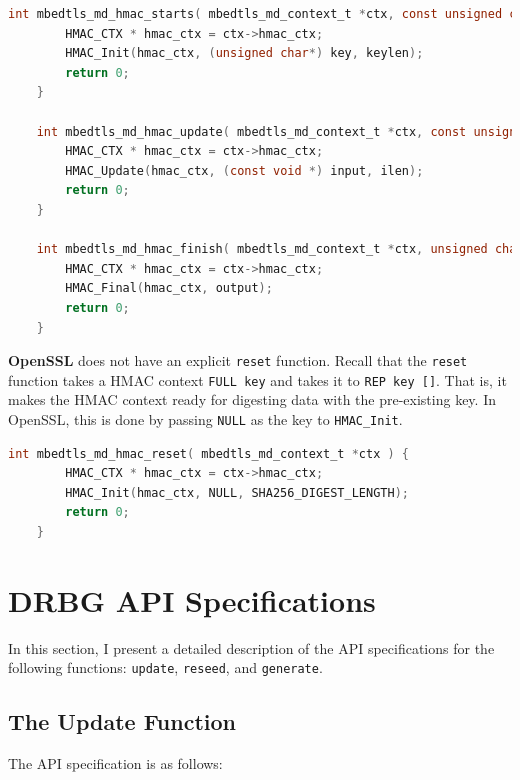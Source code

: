 \documentclass[pageno]{jpaper}
\newcommand{\stdtitle}[1]{\textbf{#1}}
\begin{document}
\begin{lstlisting}[language=C]
    int mbedtls_md_hmac_starts( mbedtls_md_context_t *ctx, const unsigned char *key, size_t keylen ) {
        HMAC_CTX * hmac_ctx = ctx->hmac_ctx;
        HMAC_Init(hmac_ctx, (unsigned char*) key, keylen);
        return 0;
    }

    int mbedtls_md_hmac_update( mbedtls_md_context_t *ctx, const unsigned char *input, size_t ilen ) {
        HMAC_CTX * hmac_ctx = ctx->hmac_ctx;
        HMAC_Update(hmac_ctx, (const void *) input, ilen);
        return 0;
    }

    int mbedtls_md_hmac_finish( mbedtls_md_context_t *ctx, unsigned char *output) {
        HMAC_CTX * hmac_ctx = ctx->hmac_ctx;
        HMAC_Final(hmac_ctx, output);
        return 0;
    }
\end{lstlisting}

\stdtitle{OpenSSL} does not have an explicit \lstinline{reset} function. Recall that the \lstinline{reset} function takes a HMAC context \lstinline{FULL key} and takes it to \lstinline{REP key []}. That is, it makes the HMAC context ready for digesting data with the pre-existing key. In OpenSSL, this is done by passing \lstinline{NULL} as the key to \lstinline{HMAC_Init}.

\begin{lstlisting}[language=C]
    int mbedtls_md_hmac_reset( mbedtls_md_context_t *ctx ) {
        HMAC_CTX * hmac_ctx = ctx->hmac_ctx;
        HMAC_Init(hmac_ctx, NULL, SHA256_DIGEST_LENGTH);
        return 0;
    }
\end{lstlisting}
\section{DRBG API Specifications} \label{appendix_api}
In this section, I present a detailed description of the API specifications for the following functions: \lstinline{update}, \lstinline{reseed}, and \lstinline{generate}.

\subsection{The Update Function}

The API specification is as follows:
\end{document}
